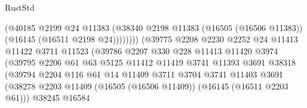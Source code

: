 \begin{lexlean}{RustStd}
\begin{coremodule}
                                          (@40185
                                            @2199
                                            @24
                                            @11383
                                            (@38340
                                              @2198
                                              @11383
                                              (@16505 (@16506 @11383))
                                              (@16145 (@16511 @2198 @24))))))))
                                  (@39775
                                    @2208
                                    @2230
                                    @2252
                                    @24
                                    @11413
                                    @11422
                                    @3711
                                    @11523
                                    (@39786
                                      @2207
                                      @330
                                      @228
                                      @11413
                                      @11420
                                      @3974
                                      (@39795
                                        @2206
                                        @61
                                        @63
                                        @5125
                                        @11412
                                        @11419
                                        @3741
                                        @11393
                                        @3691
                                        @38318
                                        (@39794
                                          @2204
                                          @116
                                          @61
                                          @14
                                          @11409
                                          @3711
                                          @3704
                                          @3741
                                          @11403
                                          @3691
                                          (@38278
                                            @2203
                                            @11409
                                            (@16505 (@16506 @11409))
                                            (@16145 (@16511 @2203 @61)))
                                          @38245
                                          @16584

\end{coremodule}
\end{lexlean}
